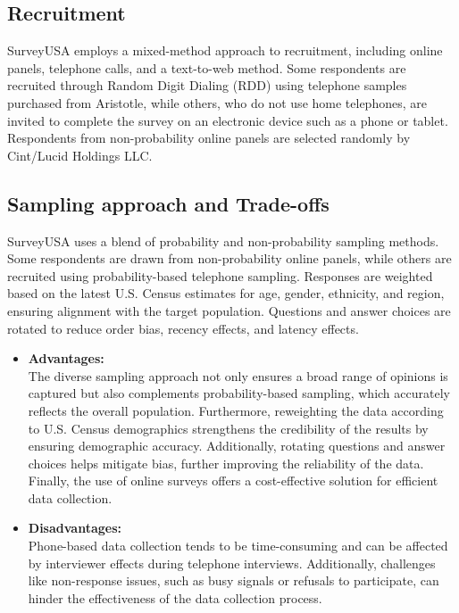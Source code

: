 \documentclass[
  letterpaper,
  DIV=11,
  numbers=noendperiod]{scrartcl}
\providecommand{\tightlist}{%
  \setlength{\itemsep}{0pt}\setlength{\parskip}{0pt}}\usepackage{longtable,booktabs,array}
\begin{document}
\subsection{\texorpdfstring{Recruitment\\
}{Recruitment }}\label{recruitment}

SurveyUSA employs a mixed-method approach to recruitment, including
online panels, telephone calls, and a text-to-web method. Some
respondents are recruited through Random Digit Dialing (RDD) using
telephone samples purchased from Aristotle, while others, who do not use
home telephones, are invited to complete the survey on an electronic
device such as a phone or tablet. Respondents from non-probability
online panels are selected randomly by Cint/Lucid Holdings LLC.\\

\subsection{\texorpdfstring{Sampling approach and Trade-offs\\
}{Sampling approach and Trade-offs }}\label{sampling-approach-and-trade-offs}

SurveyUSA uses a blend of probability and non-probability sampling
methods. Some respondents are drawn from non-probability online panels,
while others are recruited using probability-based telephone sampling.
Responses are weighted based on the latest U.S. Census estimates for
age, gender, ethnicity, and region, ensuring alignment with the target
population. Questions and answer choices are rotated to reduce order
bias, recency effects, and latency effects.\\

\begin{itemize}
\tightlist
\item
  \textbf{Advantages:}\\
  The diverse sampling approach not only ensures a broad range of
  opinions is captured but also complements probability-based sampling,
  which accurately reflects the overall population. Furthermore,
  reweighting the data according to U.S. Census demographics strengthens
  the credibility of the results by ensuring demographic accuracy.
  Additionally, rotating questions and answer choices helps mitigate
  bias, further improving the reliability of the data. Finally, the use
  of online surveys offers a cost-effective solution for efficient data
  collection.\\
\item
  \textbf{Disadvantages:}\\
  Phone-based data collection tends to be time-consuming and can be
  affected by interviewer effects during telephone interviews.
  Additionally, challenges like non-response issues, such as busy
  signals or refusals to participate, can hinder the effectiveness of
  the data collection process.\\
\end{itemize}
\end{document}
